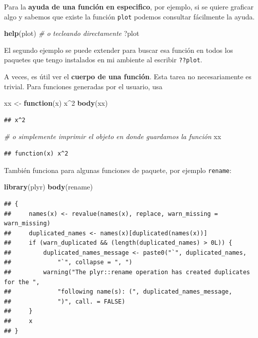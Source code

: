 \documentclass[]{article}
\newenvironment{Shaded}{\begin{snugshade}}{\end{snugshade}}
\newcommand{\KeywordTok}[1]{\textcolor[rgb]{0.13,0.29,0.53}{\textbf{#1}}}
\newcommand{\DecValTok}[1]{\textcolor[rgb]{0.00,0.00,0.81}{#1}}
\newcommand{\StringTok}[1]{\textcolor[rgb]{0.31,0.60,0.02}{#1}}
\newcommand{\CommentTok}[1]{\textcolor[rgb]{0.56,0.35,0.01}{\textit{#1}}}
\newcommand{\ControlFlowTok}[1]{\textcolor[rgb]{0.13,0.29,0.53}{\textbf{#1}}}
\newcommand{\OperatorTok}[1]{\textcolor[rgb]{0.81,0.36,0.00}{\textbf{#1}}}
\newcommand{\NormalTok}[1]{#1}
\begin{document}
Para la \textbf{ayuda de una función en especifico}, por ejemplo, si se
quiere graficar algo y sabemos que existe la función \texttt{plot}
podemos consultar fácilmente la ayuda.

\begin{Shaded}
\begin{Highlighting}[]
\KeywordTok{help}\NormalTok{(plot)}
\CommentTok{# o tecleando directamente}
\NormalTok{?plot}
\end{Highlighting}
\end{Shaded}

El segundo ejemplo se puede extender para buscar esa función en todos
los paquetes que tengo instalados en mi ambiente al escribir
\texttt{??plot}.

A veces, es útil ver el \textbf{cuerpo de una función}. Esta tarea no
necesariamente es trivial. Para funciones generadas por el usuario, usa

\begin{Shaded}
\begin{Highlighting}[]
\NormalTok{xx <-}\StringTok{ }\ControlFlowTok{function}\NormalTok{(x) x}\OperatorTok{^}\DecValTok{2}
\KeywordTok{body}\NormalTok{(xx)}
\end{Highlighting}
\end{Shaded}

\begin{verbatim}
## x^2
\end{verbatim}

\begin{Shaded}
\begin{Highlighting}[]
\CommentTok{# o simplemente imprimir el objeto en donde guardamos la función}
\NormalTok{xx}
\end{Highlighting}
\end{Shaded}

\begin{verbatim}
## function(x) x^2
\end{verbatim}

También funciona para algunas funciones de paquete, por ejemplo
\texttt{rename}:

\begin{Shaded}
\begin{Highlighting}[]
\KeywordTok{library}\NormalTok{(plyr)}
\KeywordTok{body}\NormalTok{(rename)}
\end{Highlighting}
\end{Shaded}

\begin{verbatim}
## {
##     names(x) <- revalue(names(x), replace, warn_missing = warn_missing)
##     duplicated_names <- names(x)[duplicated(names(x))]
##     if (warn_duplicated && (length(duplicated_names) > 0L)) {
##         duplicated_names_message <- paste0("`", duplicated_names, 
##             "`", collapse = ", ")
##         warning("The plyr::rename operation has created duplicates for the ", 
##             "following name(s): (", duplicated_names_message, 
##             ")", call. = FALSE)
##     }
##     x
## }
\end{verbatim}
\end{document}
